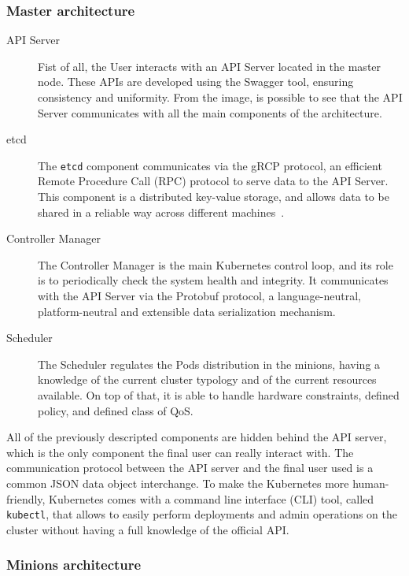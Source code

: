 \subsubsection{Master architecture}
\begin{description}
\item[API Server] Fist of all, the User interacts with an API Server located in
  the master node. These APIs are developed using the Swagger tool, ensuring
  consistency and uniformity. From the image, is possible to see that the API
  Server communicates with all the main components of the architecture.
\item[etcd] The \verb!etcd! component communicates via the gRCP protocol, an
  efficient Remote Procedure Call (RPC) protocol to serve data to the API
  Server. This component is a distributed key-value storage, and allows data to
  be shared in a reliable way across different machines~\cite{etcddatamodel}.
\item[Controller Manager] The Controller Manager is the main Kubernetes control
  loop, and its role is to periodically check the system health and integrity.
  It communicates with the API Server via the Protobuf protocol, a
  language-neutral, platform-neutral and extensible data serialization
  mechanism.
\item[Scheduler] The Scheduler regulates the Pods distribution in the minions,
  having a knowledge of the current cluster typology and of the current
  resources available. On top of that, it is able to handle hardware
  constraints, defined policy, and defined class of QoS.
\end{description}

All of the previously descripted components are hidden behind the API server,
which is the only component the final user can really interact with. The
communication protocol between the API server and the final user used is a
common JSON data object interchange. To make the Kubernetes more human-friendly,
Kubernetes comes with a command line interface (CLI) tool, called
\verb!kubectl!, that allows to easily perform deployments and admin operations
on the cluster without having a full knowledge of the official API.

\subsubsection{Minions architecture}

